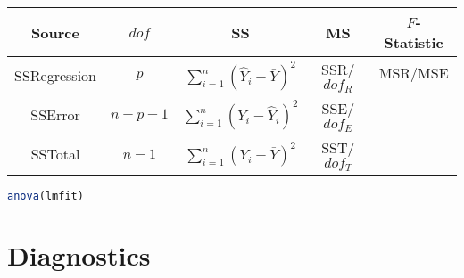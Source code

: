     \begin{table}[H]
        \label{TableMultivariateANOVA}
        \centering
        \renewcommand\arraystretch{1}
        \begin{tabular}{c|cccc}
            \hline
            Source&$ dof $&SS&MS&$ F $-Statistic\\\hline
            SSRegression&$ p $&$ \sum_{i=1}^n(\hat{Y}_i-\bar{Y})^2  $&SSR/$ dof_R $& $ \mathrm{MSR}/\mathrm{MSE} $\\
            SSError&$ n-p-1 $&$ \sum_{i=1}^n(Y_i-\hat{Y}_i)^2  $&SSE/$ dof_E $& \\
            SSTotal&$ n-1 $&$ \sum_{i=1}^n(Y_i-\bar{Y})^2  $&SST/$ dof_T $& \\
            \hline
        \end{tabular}
    \end{table}
\begin{rcode}
    \begin{lstlisting}[language=R]
anova(lmfit)
    \end{lstlisting}
\end{rcode}    






     




\section{Diagnostics}\label{SubSectionDiagnosticsForMonoModel}


\providecommand{\cmark}[2][]{%
  \begin{pgfonlayer}{marx}
    \node [nmark] at (c#2#1) {#2};
  \end{pgfonlayer}{marx}
  } 
\providecommand{\cmark}[2][]{\relax} 

